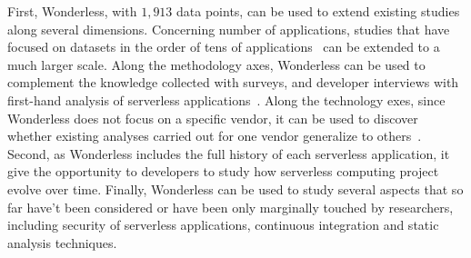First, Wonderless, with $1,913$ data points, can be used to extend existing 
studies along several dimensions. Concerning number of applications,
studies that have focused on datasets in the order of tens of 
applications~\cite{eismann2020serverless} can be extended to a much larger scale.
Along the methodology axes, Wonderless can be used to complement the knowledge collected 
with surveys, and developer interviews with first-hand analysis of
serverless applications~\cite{leitner2019mixed}.
Along the technology exes, since Wonderless does not focus on a specific vendor, it can be used
to discover whether existing analyses carried out for one vendor
generalize to others~\cite{spillner2019quantitative}.
%
Second, as Wonderless includes the full history of each serverless application, 
it give the opportunity to developers to study how serverless computing 
project evolve over time.
%
Finally, Wonderless can be used to study several aspects that so far have't
been considered or have been only marginally touched by researchers, 
including security of serverless applications, continuous integration and
static analysis techniques.










